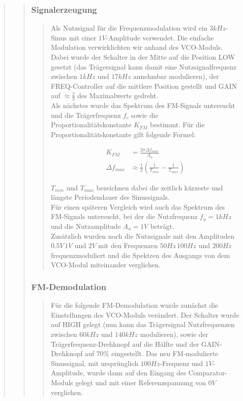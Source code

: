 \begin{quote}
\begin{quote}
        \subsubsection{Signalerzeugung}
        \begin{quote}
        Als Nutzsignal für die Frequenzmodulation wird ein $3 kHz$-Sinus mit
        einer $1 V$-Amplitude verwendet. Die einfache Modulation verwirklichten
        wir anhand des VCO-Moduls. Dabei wurde der Schalter in der Mitte auf
        die Position LOW gesetzt (das Trägersignal kann damit eine
        Nutzsignalfrequenz zwischen $1 kHz$ und $17 kHz$ annehmbar modulieren),
        der FREQ-Controller auf die mittlere Position gestellt und GAIN auf
        $\approx \frac{2}{3}$ des Maximalwerts gedreht.\\
        Als nächstes wurde das Spektrum des FM-Signals untersucht und die
        Trägerfrequenz $f_c$ sowie die Proportionalitätskonstante $K_{FM}$
        bestimmt. Für die Proportionalitätskonstante gilt folgende Formel:
        
        \begin{equation*}
    	\begin{split}
    		K_{FM} &= \frac{2 \pi \Delta f_{max}}{A_u}\\
			\Delta f_{max} &\approx \frac{1}{2} (\frac{1}{T_{min}} - \frac{1}{T_{max}})    		
    	\end{split}
    	\end{equation*}
    	
   		$T_{min}$ und $T_{max}$ bezeichnen dabei die zeitlich kürzeste und längste
   		Periodendauer des Sinussignals.\\
   		Für einen späteren Vergleich wird auch das Spektrum des FM-Signals
   		untersucht, bei der die Nutzfrequenz $f_u = 1 kHz$ und die Nutzamplitude
   		$A_u = 1 V$ beträgt.\\
   		Zusätzlich wurden noch die Nutzsignale mit den Amplituden $0.5 V\, 1 V$ und
   		$2 V$ mit den Frequenzen $50 Hz\, 100 Hz$ und $200 Hz$ frequenzmoduliert
   		und die Spektren des Ausgangs von dem VCO-Modul miteinander verglichen. 
        \end{quote}
        
        \subsubsection{FM-Demodulation}
        \begin{quote}
        Für die folgende FM-Demodulation wurde zunächst die Einstellungen des VCO-Moduls verändert. Der Schalter wurde
        auf HIGH gelegt (nun kann das Trägersignal Nutzfrequenzen zwischen $60 kHz$ und $140 kHz$ modulieren), sowie der
        Trägerfrequenz-Drehknopf auf die Hälfte und der GAIN-Drehknopf auf $70 \%$ eingestellt. Das neu FM-modulierte
        Sinussignal, mit ursprünglich $100 Hz$-Frequenz und $1 V$-Amplitude, wurde dann auf den Eingang des
        Comparator-Moduls gelegt und mit einer Referenzspannung von $0 V$ verglichen.\\
        

\end{quote}
\end{quote}
\end{quote}
